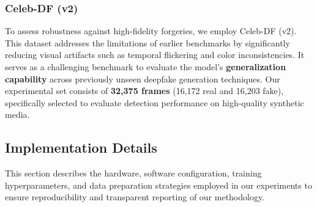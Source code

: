 \documentclass[conference]{IEEEtran}
\begin{document}
\subsubsection{Celeb-DF (v2)}
To assess robustness against high-fidelity forgeries, we employ Celeb-DF (v2). This dataset addresses the limitations of earlier benchmarks by significantly reducing visual artifacts such as temporal flickering and color inconsistencies. It serves as a challenging benchmark to evaluate the model's \textbf{generalization capability} across previously unseen deepfake generation techniques. Our experimental set consists of \textbf{32,375 frames} (16,172 real and 16,203 fake), specifically selected to evaluate detection performance on high-quality synthetic media.



%
%
%
%


\subsection{Implementation Details}

This section describes the hardware, software configuration, training hyperparameters, and data preparation strategies employed in our experiments to ensure reproducibility and transparent reporting of our methodology.

\end{document}
